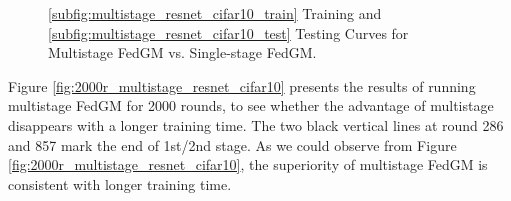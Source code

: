 \begin{figure}[h]
\vspace*{-6pt}
\centering
{}
\vspace*{-6pt}
\caption{\ref{subfig:multistage_resnet_cifar10_train} Training and \ref{subfig:multistage_resnet_cifar10_test} Testing Curves for Multistage FedGM vs. Single-stage FedGM.}
\label{fig:resnet_cifar10_multistage_remake}
\end{figure}

\fi

Figure \ref{fig:2000r_multistage_resnet_cifar10} presents the results of running multistage FedGM for 2000 rounds, to see whether the advantage of multistage disappears with a longer training time. The two black vertical lines at round 286 and 857 mark the end of 1st/2nd stage. As we could observe from Figure \ref{fig:2000r_multistage_resnet_cifar10}, the superiority of multistage FedGM is consistent with longer training time.

